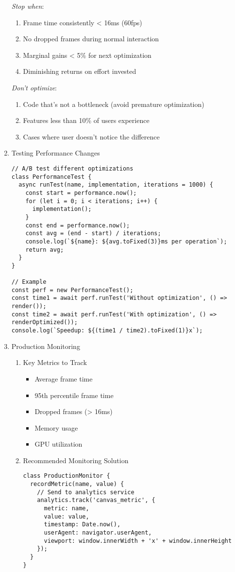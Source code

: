\documentclass[11pt]{article}
\begin{document}
\begin{enumerate}
\emph{Stop when}:
\begin{enumerate}
\item Frame time consistently < 16ms (60fps)
\item No dropped frames during normal interaction
\item Marginal gains < 5\% for next optimization
\item Diminishing returns on effort invested
\end{enumerate}

\emph{Don't optimize}:
\begin{enumerate}
\item Code that's not a bottleneck (avoid premature optimization)
\item Features less than 10\% of users experience
\item Cases where user doesn't notice the difference
\end{enumerate}
\item Testing Performance Changes
\label{sec:org6094c2d}

\begin{verbatim}
// A/B test different optimizations
class PerformanceTest {
  async runTest(name, implementation, iterations = 1000) {
    const start = performance.now();
    for (let i = 0; i < iterations; i++) {
      implementation();
    }
    const end = performance.now();
    const avg = (end - start) / iterations;
    console.log(`${name}: ${avg.toFixed(3)}ms per operation`);
    return avg;
  }
}

// Example
const perf = new PerformanceTest();
const time1 = await perf.runTest('Without optimization', () => render());
const time2 = await perf.runTest('With optimization', () => renderOptimized());
console.log(`Speedup: ${(time1 / time2).toFixed(1)}x`);
\end{verbatim}
\item Production Monitoring
\label{sec:org394035a}

\begin{enumerate}
\item Key Metrics to Track
\label{sec:orgccd14c0}
\begin{itemize}
\item Average frame time
\item 95th percentile frame time
\item Dropped frames (> 16ms)
\item Memory usage
\item GPU utilization
\end{itemize}
\item Recommended Monitoring Solution
\label{sec:org5e05f8f}
\begin{verbatim}
class ProductionMonitor {
  recordMetric(name, value) {
    // Send to analytics service
    analytics.track('canvas_metric', {
      metric: name,
      value: value,
      timestamp: Date.now(),
      userAgent: navigator.userAgent,
      viewport: window.innerWidth + 'x' + window.innerHeight
    });
  }
}
\end{verbatim}


\end{enumerate}
\end{enumerate}
\end{document}
